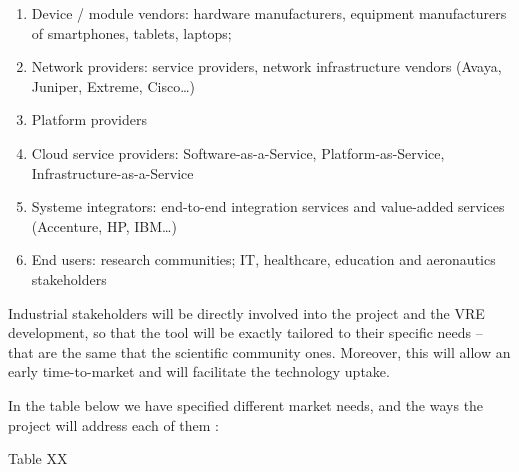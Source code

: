 \begin{enumerate}
\item Device / module vendors: hardware manufacturers, equipment
manufacturers of smartphones, tablets, laptops;
\item Network providers: service providers, network infrastructure
vendors (Avaya, Juniper, Extreme, Cisco…)
\item Platform providers
\item Cloud service providers: Software-as-a-Service,
Platform-as-Service, Infrastructure-as-a-Service
\item Systeme integrators: end-to-end integration services and
value-added services (Accenture, HP, IBM…)
\item End users: research communities; IT, healthcare, education and
aeronautics stakeholders
\end{enumerate}
Industrial stakeholders will be directly involved into the project and
the VRE development, so that the tool will be exactly tailored to their
specific needs – that are the same that the scientific community ones.
Moreover, this will allow an early time-to-market and will facilitate
the technology uptake.

In the table below we have specified different market needs, and the
ways the project will address each of them :

Table XX

